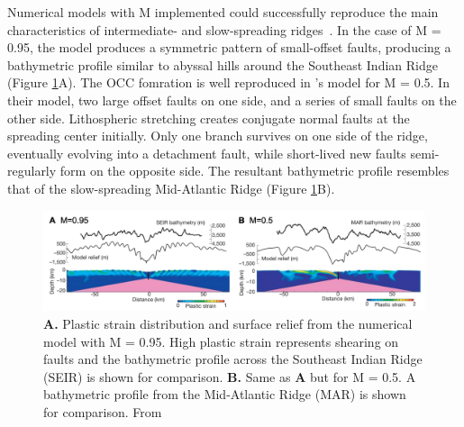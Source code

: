\documentclass[letterpaper,12pt,notitle]{memphisthesis}                     %
\begin{document}
Numerical models with M implemented could successfully reproduce the main characteristics of intermediate- and slow-spreading ridges~\citep{Buck2005}.
In the case of M = 0.95, the model produces a symmetric pattern of small-offset faults, producing a bathymetric profile similar to abyssal hills around the Southeast Indian Ridge (Figure \ref{fig:mfactor}A). 
The OCC fomration is well reproduced in \citet{Buck2005}'s model for M = 0.5. In their model, two large offset faults on one side, and a series of small faults on the other side. Lithospheric stretching creates conjugate normal faults at the spreading center initially. Only one branch survives on one side of the ridge, eventually evolving into a detachment fault, while short-lived new faults semi-regularly form on the opposite side. The resultant bathymetric profile resembles that of the slow-spreading Mid-Atlantic Ridge (Figure \ref{fig:mfactor}B).
%
\begin{figure}[!htb]
	\centering
	\includegraphics[width=0.9\linewidth,trim=4 4 4 4,clip]{./figs/fig1.png}
	\caption{\textbf{A.} Plastic strain distribution and surface relief from the numerical model with M = 0.95. High plastic strain represents shearing on faults and the bathymetric profile across the Southeast Indian Ridge (SEIR) is shown for comparison. \textbf{B.} Same as \textbf{A} but for M = 0.5. A bathymetric profile from the Mid-Atlantic Ridge (MAR) is shown for comparison. From \citet{Buck2005}}
	\label{fig:mfactor}
\end{figure}


%
%
%
%
\end{document}
